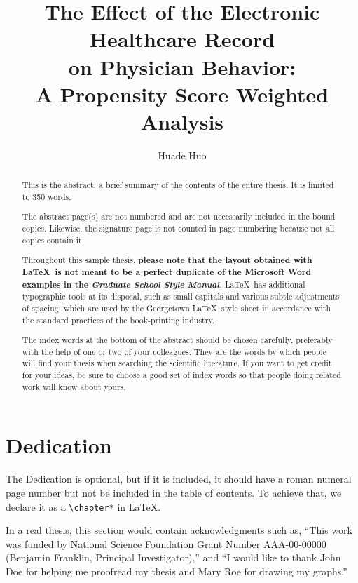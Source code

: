 \documentclass[12pt]{report}
\title{The Effect of the Electronic Healthcare Record \\
on Physician Behavior:\\
A Propensity Score Weighted Analysis}
\author{Huade Huo}
\begin{document}

\maketitle    %

\begin{abstract}
This is the abstract, a brief summary of the contents of the entire thesis.
It is limited to 350 words.

The abstract page(s) are not numbered and are not necessarily included
in the bound copies.  Likewise, the signature page is not counted in
page numbering because not all copies contain it.

Throughout this sample thesis, {\bf please note
that the layout obtained with \LaTeX\ is not meant to be a
perfect duplicate of the Microsoft Word examples in the \emph{Graduate
School Style Manual.}}  \LaTeX\ has additional typographic tools at its
disposal, such as {\sc small capitals} and various subtle adjustments
of spacing, which are used by the Georgetown \LaTeX\ style sheet in
accordance with the standard practices of the book-printing industry.

The index words at the bottom of the abstract should be chosen carefully,
preferably with the help of one or two of your colleagues.
They are the words by which people will find your thesis when searching
the scientific literature.
If you want to get credit for your ideas, be sure to choose a good set of
index words so that people doing related work will know about yours.
\end{abstract}


\chapter*{Dedication}

The Dedication is optional, but if it is included, it should have
a roman numeral page number but not be included in the table of
contents.  To achieve that, we declare it as a \verb"\chapter*" in \LaTeX.



In a real thesis, this section would contain acknowledgments such
as, ``This work was funded by National Science Foundation Grant
Number AAA-00-00000 (Benjamin Franklin, Principal Investigator),''
and ``I would like to thank John Doe for helping me proofread my
thesis and Mary Roe for drawing my graphs.''
\end{document}

